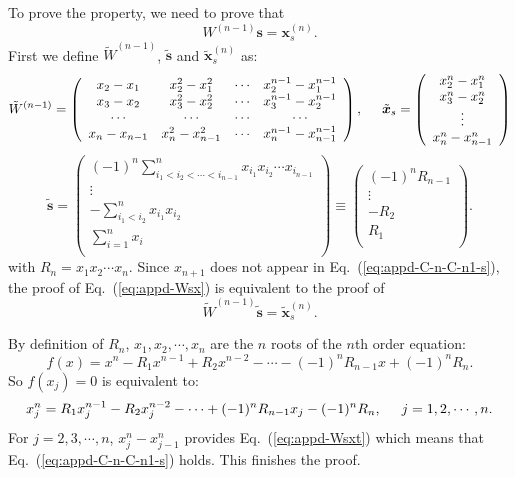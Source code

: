 \documentclass[]{article}
\def\Matrix#1{\left(#1\right)}
\def\Matrix#1{\left(#1\right)}
\begin{document}
To prove the property, we need to prove that
\begin{equation}
W^{(n-1)}\bm s = \bm x_s^{(n)}.
\label{eq:appd-Wsx}
\end{equation}
First we define $\tilde{W}^{(n-1)}$, $\tilde{\bm s}$ and $\tilde{\bm x}_s^{(n)}$
as:
\[
\tilde W^{(n-1)}=\Matrix{\begin{array}{cccc} x_2-x_1 & x_2^2-x_1^2 & \cdots & x_2^{n-1}-x_1^{n-1} \\ x_3-x_2 & x_3^2-x_2^2 & \cdots & x_3^{n-1}-x_2^{n-1} \\ \cdots& \cdots& \cdots& \cdots \\ x_{n}-x_{n-1} & x_{n}^2-x_{n-1}^2 & \cdots & x_{n}^{n-1}-x_{n-1}^{n-1} \\ \end{array}},\hspace{5mm} \tilde{\bm x}_s =\Matrix{\begin{array}{c} x_2^n-x_1^n \\ x_3^n-x_2^n \\ \vdots \\ x_n^n-x_{n-1}^n \\ \end{array} } \] \[\tilde{\bm s}=\Matrix{\begin{array}{r} \displaystyle (-1)^{n}\sum_{i_1<i_2<\cdots<i_{n-1}}^n x_{i_1}x_{i_2}\cdots x_{i_{n-1}} \\ \vdots\hspace{1cm} \\ \displaystyle -\sum_{i_1<i_2}^n x_{i_1}x_{i_2} \\[5mm] \displaystyle \sum_{i=1}^n x_i \\ \end{array}}\equiv \Matrix{\begin{array}{r} (-1)^{n}R_{n-1}\\ \vdots\ \ \\ -R_2\\ R_1 \\ \end{array}}.
\]
with $R_n = x_1x_2\cdots x_n$. Since $x_{n+1}$ does not appear in
Eq.~(\ref{eq:appd-C-n-C-n1-s}), the proof of Eq.~(\ref{eq:appd-Wsx}) is
equivalent to the proof of
\begin{equation}
\tilde{W}^{(n-1)}\tilde{\bm s} = \tilde{\bm x}_s^{(n)}.
\label{eq:appd-Wsxt}
\end{equation}

By definition of $R_n$, $x_1,x_2,\cdots,x_n$ are the $n$ roots of the $n$th order equation:
\[
f(x) = x^n-R_1x^{n-1}+R_2x^{n-2}-\cdots -(-1)^nR_{n-1}x+ (-1)^nR_n.
\]
So $f(x_j)=0$ is equivalent to:
\[
x_j^n=R_1x_j^{n-1}-R_2x_j^{n-2}-\cdots +(-1)^nR_{n-1}x_j- (-1)^nR_n,\hspace{5mm}j=1,2,\cdots,n.
\]
For $j=2,3,\cdots,n$, $x_j^n-x_{j-1}^n$ provides Eq.~(\ref{eq:appd-Wsxt}) which
means that Eq.~(\ref{eq:appd-C-n-C-n1-s}) holds. This finishes the proof.
\end{document}
